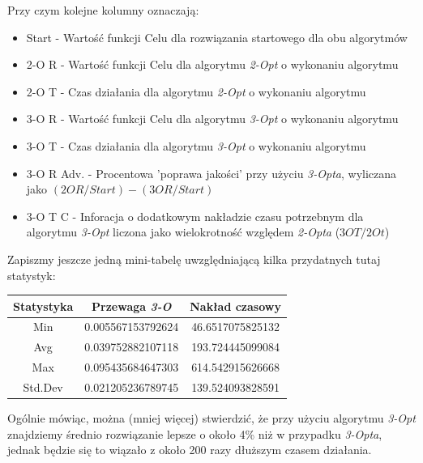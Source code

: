 \documentclass{article}
\begin{document}
Przy czym kolejne kolumny oznaczają:
\begin{itemize}
	\item Start - Wartość funkcji Celu dla rozwiązania startowego dla obu algorytmów
	\item 2-O R - Wartość funkcji Celu dla algorytmu \textit{2-Opt} o wykonaniu algorytmu
	\item 2-O T - Czas działania dla algorytmu \textit{2-Opt} o wykonaniu algorytmu
	\item 3-O R - Wartość funkcji Celu dla algorytmu \textit{3-Opt} o wykonaniu algorytmu
	\item 3-O T - Czas działania dla algorytmu \textit{3-Opt} o wykonaniu algorytmu
	\item 3-O R Adv. - Procentowa 'poprawa jakości' przy użyciu \textit{3-Opta}, wyliczana jako $(2OR/Start) - (3OR/Start)$
	\item 3-O T C - Inforacja o dodatkowym nakładzie czasu potrzebnym dla algorytmu \textit{3-Opt} liczona jako wielokrotność względem \textit{2-Opta} ($3OT / 2Ot$)
\end{itemize}

Zapiszmy jeszcze jedną mini-tabelę uwzględniającą kilka przydatnych tutaj statystyk:
\begin{table}[h!]
\centering
\begin{tabular}{c||c|c}
Statystyka & Przewaga \textit{3-O} & Nakład czasowy \\
\hline
Min & 0.005567153792624 & 46.6517075825132 \\
Avg & 0.039752882107118 & 193.724445099084 \\
Max & 0.095435684647303 & 614.542915626668 \\
Std.Dev & 0.021205236789745 & 139.524093828591 \\
\end{tabular}
\end{table}

Ogólnie mówiąc, można (mniej więcej) stwierdzić, że przy użyciu algorytmu \textit{3-Opt} znajdziemy średnio rozwiązanie lepsze o około 4\% niż w przypadku \textit{3-Opta}, jednak będzie się to wiązało z około 200 razy dłuższym czasem działania.

\newpage
\end{document}
